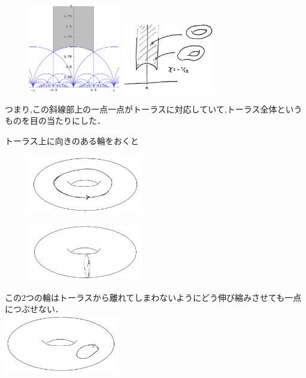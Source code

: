 \begin{figure}[h]
\begin{minipage}{0.5\hsize}
\includegraphics[width=4cm]{asaka8.png}
\end{minipage}
\begin{minipage}{0.5\hsize}
\includegraphics[width=4cm]{asaka9.jpg}
\end{minipage}
\end{figure}

つまり,この斜線部上の一点一点がトーラスに対応していて,トーラス全体というものを目の当たりにした．

トーラス上に向きのある輪をおくと\\
\begin{figure}[h]
\begin{minipage}{0.5\hsize}
\includegraphics[width=5cm]{asaka10.png}\\
\end{minipage}
\begin{minipage}{0.5\hsize}
\includegraphics[width=5cm]{asaka101.png}\\
\end{minipage}
\end{figure}
この2つの輪はトーラスから離れてしまわないようにどう伸び縮みさせても一点につぶせない．\\
\includegraphics[width=5cm]{asaka11.png}

